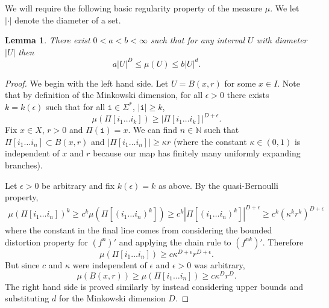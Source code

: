 \documentclass[11pt, reqno]{amsart}
\numberwithin{equation}{section}
\theoremstyle{plain}%
\newtheorem{lma}[thm]{Lemma}
\theoremstyle{definition}
\def\N{\ensuremath{\mathbb N}}
\renewcommand{\i}{\mathtt{i}}
\theoremstyle{nonumberplain}
\begin{document}
We will require the following basic regularity property of the measure $\mu$. We let $|\cdot|$ denote the diameter of a set.

\begin{lma} \label{lem:weakreg}
There exist $0<a<b<\infty$ such that for any interval $U$ with diameter $|U|$ then 
\begin{equation*}
a|U|^{D} \leq \mu(U) \leq b |U|^{d}.
\label{eq:weakreg}
\end{equation*}
\end{lma}
\begin{proof}
We begin with the left hand side. Let $U=B(x,r)$ for some $x \in I$. Note that by definition of the Minkowski dimension, for all $\epsilon>0$ there exists $k=k(\epsilon)$ such that for all $\i \in \Sigma^*$, $|\i|\ge k$, 
$$\mu(\Pi[i_1 \ldots i_k]) \geq |\Pi[i_1 \ldots i_k]|^{D+\epsilon}.$$
Fix $x \in X$, $r>0$ and $\Pi(\i)=x$. We can find $n \in \N$ such that $\Pi[i_1 \ldots i_n] \subset B(x,r)$ and $|\Pi[i_1 \ldots i_n]| \geq \kappa r$ (where the constant $\kappa \in (0,1)$ is independent of $x$ and $r$ because our map has finitely many uniformly expanding branches).

Let $\epsilon>0$ be arbitrary and fix $k(\epsilon)=k$ as above. By the quasi-Bernoulli property,
\begin{align*}
\mu(\Pi[i_1 \ldots i_n])^k \geq c^k\mu(\Pi[(i_1 \ldots i_n)^k])\geq c^k|\Pi[(i_1 \ldots i_n)^k]|^{D+\epsilon} \geq c^k(\kappa^kr^k)^{D+\epsilon}
\end{align*}
where the constant in the final line comes from considering the bounded distortion property for $(f^n)'$ and applying the chain rule to $(f^{nk})'$. Therefore
$$\mu(\Pi[i_1 \ldots i_n]) \geq c\kappa^{D+\epsilon}r^{D+\epsilon}.$$
But since $c$ and $\kappa$ were independent of $\epsilon$ and $\epsilon>0$ was arbitrary,
$$\mu(B(x,r)) \geq\mu(\Pi[i_1 \ldots i_n]) \geq c\kappa^{D}r^{D}.$$
The right hand side is proved similarly by instead considering upper bounds and substituting $d$ for the Minkowski dimension $D$.

\end{proof}
\end{document}
